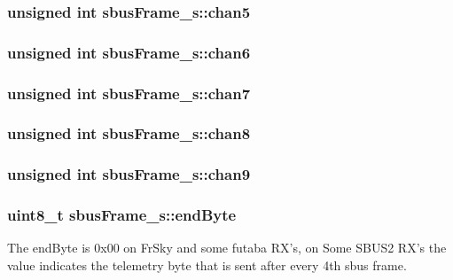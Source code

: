 \hypertarget{structsbusFrame__s_a5eb204c42032fd9722e8444ceeda6d38}{
\subsubsection[{chan5}]{\setlength{\rightskip}{0pt plus 5cm}unsigned int sbus\+Frame\+\_\+s\+::chan5}}\label{structsbusFrame__s_a5eb204c42032fd9722e8444ceeda6d38}
\hypertarget{structsbusFrame__s_a57573a7c617b921f0a39804b54ced3fb}{
\subsubsection[{chan6}]{\setlength{\rightskip}{0pt plus 5cm}unsigned int sbus\+Frame\+\_\+s\+::chan6}}\label{structsbusFrame__s_a57573a7c617b921f0a39804b54ced3fb}
\hypertarget{structsbusFrame__s_adcced9fecb0005b0786f9bc458cc967b}{
\subsubsection[{chan7}]{\setlength{\rightskip}{0pt plus 5cm}unsigned int sbus\+Frame\+\_\+s\+::chan7}}\label{structsbusFrame__s_adcced9fecb0005b0786f9bc458cc967b}
\hypertarget{structsbusFrame__s_a38b6b01145923fc928c77233dd24d47f}{
\subsubsection[{chan8}]{\setlength{\rightskip}{0pt plus 5cm}unsigned int sbus\+Frame\+\_\+s\+::chan8}}\label{structsbusFrame__s_a38b6b01145923fc928c77233dd24d47f}
\hypertarget{structsbusFrame__s_a83f4b7baf7e51edaa64f9cef4b61ab2c}{
\subsubsection[{chan9}]{\setlength{\rightskip}{0pt plus 5cm}unsigned int sbus\+Frame\+\_\+s\+::chan9}}\label{structsbusFrame__s_a83f4b7baf7e51edaa64f9cef4b61ab2c}
\hypertarget{structsbusFrame__s_a166b7f852fde475228d021eb57cacd39}{
\subsubsection[{end\+Byte}]{\setlength{\rightskip}{0pt plus 5cm}uint8\+\_\+t sbus\+Frame\+\_\+s\+::end\+Byte}}\label{structsbusFrame__s_a166b7f852fde475228d021eb57cacd39}
The end\+Byte is 0x00 on Fr\+Sky and some futaba R\+X's, on Some S\+B\+U\+S2 R\+X's the value indicates the telemetry byte that is sent after every 4th sbus frame.

